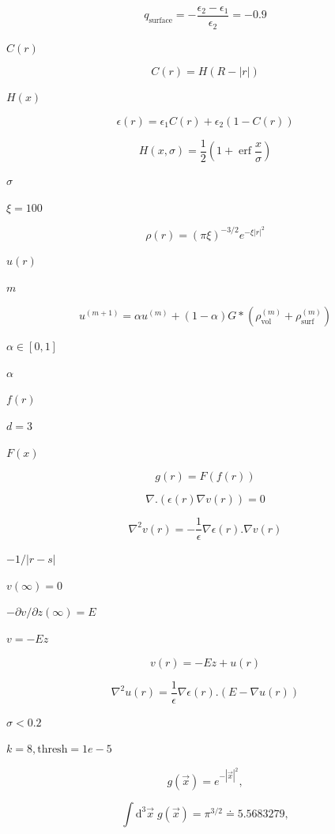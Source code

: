 \documentclass{article}
\begin{document}
\[   q_{\mbox{surface}} = -\frac{\epsilon_2 - \epsilon_1}{\epsilon_2} = -0.9
\]
\pagebreak

$C(r)$
\pagebreak

\[  C(r) = H(R-|r|)
\]
\pagebreak

$H(x)$
\pagebreak

\[   \epsilon(r) = \epsilon_1 C(r) + \epsilon_2 \left( 1 - C(r) \right)
\]
\pagebreak

\[   H(x,\sigma) = \frac{1}{2} \left( 1 + \mathop{\mathrm{erf}} \frac{x}{\sigma} \right)
\]
\pagebreak

$\sigma$
\pagebreak

$\xi=100$
\pagebreak

\[   \rho(r) = \left(\pi \xi \right)^{-3/2} e^{-\xi |r|^2}
\]
\pagebreak

$u(r)$
\pagebreak

$m$
\pagebreak

\[   u^{(m+1)} = \alpha u^{(m)} + (1-\alpha) G * \left(\rho^{(m)}_{\mbox{vol}} + \rho^{(m)}_{\mbox{surf}} \right)
\]
\pagebreak

$ \alpha \in [0,1]$
\pagebreak

$\alpha$
\pagebreak

$f(r)$
\pagebreak

$d=3$
\pagebreak

$F(x)$
\pagebreak

\[    g(r) = F(f(r))
\]
\pagebreak

\[\nabla . \left( \epsilon(r) \nabla v(r)  \right) = 0
\]
\pagebreak

\[   \nabla^2 v(r) = - \frac{1}{\epsilon} \nabla \epsilon(r) .  \nabla v(r)
\]
\pagebreak

$-1 / |r-s|$
\pagebreak

$v(\infty)=0$
\pagebreak

$- \partial v / \partial z(\infty) = E$
\pagebreak

$v = - E z$
\pagebreak

\[v(r) = - E z + u(r)
\]
\pagebreak

\[   \nabla^2 u(r) = \frac{1}{\epsilon} \nabla \epsilon(r) .  \left(E - \nabla u(r) \right)
\]
\pagebreak

$\sigma<0.2$
\pagebreak

$k=8, \mbox{thresh}=1e-5$
\pagebreak

\[ g(\vec{x}) = e^{-|\vec{x}|^2}, \]
\pagebreak

\[   \int \mathrm{d}^3 \vec{x} \; g(\vec{x}) = \pi^{3/2} \doteq 5.5683279,
\]
\pagebreak
\end{document}
